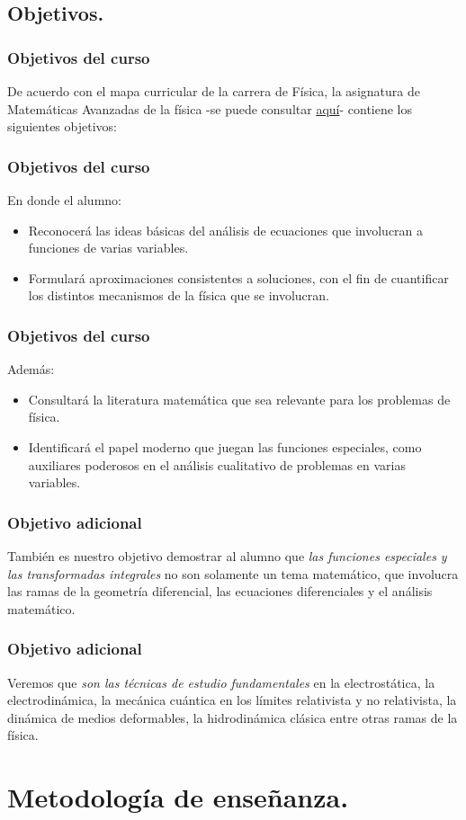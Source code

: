 \subsection{Objetivos.}
\begin{frame}
\frametitle{Objetivos del curso}
De acuerdo con el mapa curricular de la carrera de Física, la asignatura de Matemáticas Avanzadas de la física -se puede consultar \href{http://www.fciencias.unam.mx/asignaturas/610.pdf}{aquí}- contiene los siguientes objetivos:
\end{frame}
\begin{frame}
\frametitle{Objetivos del curso}
En donde el alumno:
\begin{itemize}
\setlength{\itemsep}{0mm}
\item Reconocerá las ideas básicas del análisis de ecuaciones que involucran a funciones de varias variables.
\item Formulará aproximaciones consistentes a soluciones, con el fin de cuantificar los distintos mecanismos de la física que se involucran.
\end{itemize}
\end{frame}
\begin{frame}
\frametitle{Objetivos del curso}
Además:
\begin{itemize}
\setlength{\itemsep}{0mm}
\item Consultará la literatura matemática que sea relevante para los problemas de física.
\item Identificará el papel moderno que juegan las funciones especiales, como auxiliares poderosos en el análisis cualitativo de problemas en varias variables.
\end{itemize}
\end{frame}
\begin{frame}
\frametitle{Objetivo adicional}
También es nuestro objetivo demostrar al alumno que \emph{las funciones especiales y las transformadas integrales} no son solamente un tema matemático, que involucra las ramas de la geometría diferencial, las ecuaciones diferenciales y el análisis matemático.
\end{frame}
\begin{frame}
\frametitle{Objetivo adicional}
Veremos que \emph{son las técnicas de estudio fundamentales} en la electrostática, la electrodinámica, la mecánica cuántica en los límites relativista y no relativista, la dinámica de medios deformables, la hidrodinámica clásica entre otras ramas de la física.
\end{frame}
\section{Metodología de enseñanza.}
